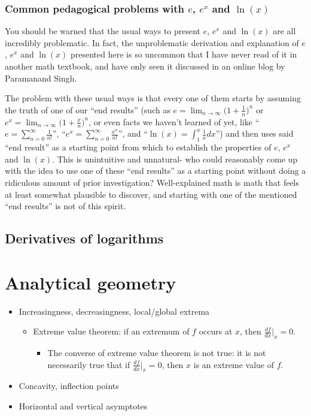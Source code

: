 \documentclass{article}
\begin{document}
\subsubsection*{Common pedagogical problems with $e$, $e^x$ and $\ln(x)$}

You should be warned that the usual ways to present $e$, $e^x$ and $\ln(x)$ are all incredibly problematic. In fact, the unproblematic derivation and explanation of $e$, $e^x$ and $\ln(x)$ presented here is so uncommon that I have never read of it in another math textbook, and have only seen it discussed in an online blog by Paramanand Singh.

The problem with these usual ways is that every one of them starts by assuming the truth of one of our ``end results'' (such as $e = \lim_{n \rightarrow \infty} \Big(1 + \frac{1}{n} \Big)^n$ or $e^x = \lim_{n \rightarrow \infty} \Big(1 + \frac{x}{n} \Big)^n$, or even facts we haven't learned of yet, like ``$e = \sum_{n = 0}^\infty \frac{1}{n!}$'', ``$e^x = \sum_{n = 0}^\infty \frac{x^n}{n!}$'', and ``$\ln(x) = \int_1^x \frac{1}{x} dx$'') and then uses said ``end result'' as a starting point from which to establish the properties of $e$, $e^x$ and $\ln(x)$. This is unintuitive and unnatural- who could reasonably come up with the idea to use one of these ``end results'' as a starting point without doing a ridiculous amount of prior investigation? Well-explained math is math that feels at least somewhat plausible to discover, and starting with one of the mentioned ``end results'' is not of this spirit.

\subsection*{Derivatives of logarithms}

\section*{Analytical geometry}

\begin{itemize}
    \item Increasingness, decreasingness, local/global extrema
    \begin{itemize}
        \item Extreme value theorem: if an extremum of $f$ occurs at $x$, then $\frac{df}{dx}\Big|_x = 0$.
        \begin{itemize}
            \item The converse of extreme value theorem is not true: it is not necessarily true that if $\frac{df}{dx}\Big|_x = 0$, then $x$ is an extreme value of $f$.
        \end{itemize}
    \end{itemize}
    \item Concavity, inflection points
    \item Horizontal and vertical asymptotes
\end{itemize}
\end{document}
